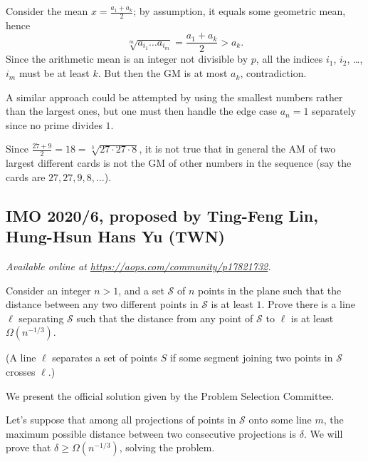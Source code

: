 \documentclass[11pt]{scrartcl}
\begin{document}
Consider the mean $x = \frac{a_1+a_k}{2}$; by assumption,
it equals some geometric mean, hence
\[ \sqrt[m]{a_{i_1} \dots a_{i_m}} = \frac{a_1 + a_k}{2} > a_k. \]
Since the arithmetic mean is an integer not divisible by $p$,
all the indices $i_1$, $i_2$, \dots, $i_m$
must be at least $k$.
But then the GM is at most $a_k$, contradiction.

\begin{remark*}
  A similar approach could be attempted by using
  the smallest numbers rather than the largest ones,
  but one must then handle the edge case $a_n = 1$
  separately since no prime divides $1$.
\end{remark*}

\begin{remark*}
  Since $\frac{27+9}{2} = 18 = \sqrt[3]{27 \cdot 27 \cdot 8}$,
  it is not true that in general the AM of two largest different cards
  is not the GM of other numbers in the sequence
  (say the cards are $27, 27, 9, 8, \dots$).
\end{remark*}
\pagebreak

\subsection{IMO 2020/6, proposed by Ting-Feng Lin, Hung-Hsun Hans Yu (TWN)}
\textsl{Available online at \url{https://aops.com/community/p17821732}.}
\begin{mdframed}[style=mdpurplebox,frametitle={Problem statement}]
Consider an integer $n > 1$, and a set $\mathcal S$ of $n$ points
in the plane such that the distance between any two different points
in $\mathcal S$ is at least $1$.
Prove there is a line $\ell$ separating $\mathcal S$
such that the distance from any point of $\mathcal S$ to $\ell$
is at least $\Omega(n^{-1/3})$.

(A line $\ell$ separates a set of points $S$
if some segment joining two points in $\mathcal S$ crosses $\ell$.)
\end{mdframed}
We present the official solution given by the Problem Selection Committee.

Let's suppose that among all projections
of points in $\mathcal S$ onto some line $m$,
the maximum possible distance between two consecutive projections is $\delta$.
We will prove that $\delta \ge \Omega(n^{-1/3})$,
solving the problem.
\end{document}
